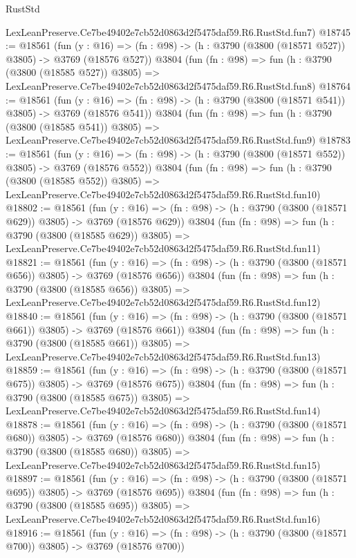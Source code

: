\begin{lexlean}{RustStd}
\begin{coremodule}
    LexLeanPreserve.Ce7be49402e7cb52d0863d2f5475daf59.R6.RustStd.fun7)
@18745 := @18561
    (fun (y : @16) => (fn : @98) -> (h : @3790 (@3800 (@18571 @527)) @3805) -> @3769 (@18576 @527))
    @3804
    (fun (fn : @98) =>
    fun (h : @3790 (@3800 (@18585 @527)) @3805) =>
    LexLeanPreserve.Ce7be49402e7cb52d0863d2f5475daf59.R6.RustStd.fun8)
@18764 := @18561
    (fun (y : @16) => (fn : @98) -> (h : @3790 (@3800 (@18571 @541)) @3805) -> @3769 (@18576 @541))
    @3804
    (fun (fn : @98) =>
    fun (h : @3790 (@3800 (@18585 @541)) @3805) =>
    LexLeanPreserve.Ce7be49402e7cb52d0863d2f5475daf59.R6.RustStd.fun9)
@18783 := @18561
    (fun (y : @16) => (fn : @98) -> (h : @3790 (@3800 (@18571 @552)) @3805) -> @3769 (@18576 @552))
    @3804
    (fun (fn : @98) =>
    fun (h : @3790 (@3800 (@18585 @552)) @3805) =>
    LexLeanPreserve.Ce7be49402e7cb52d0863d2f5475daf59.R6.RustStd.fun10)
@18802 := @18561
    (fun (y : @16) => (fn : @98) -> (h : @3790 (@3800 (@18571 @629)) @3805) -> @3769 (@18576 @629))
    @3804
    (fun (fn : @98) =>
    fun (h : @3790 (@3800 (@18585 @629)) @3805) =>
    LexLeanPreserve.Ce7be49402e7cb52d0863d2f5475daf59.R6.RustStd.fun11)
@18821 := @18561
    (fun (y : @16) => (fn : @98) -> (h : @3790 (@3800 (@18571 @656)) @3805) -> @3769 (@18576 @656))
    @3804
    (fun (fn : @98) =>
    fun (h : @3790 (@3800 (@18585 @656)) @3805) =>
    LexLeanPreserve.Ce7be49402e7cb52d0863d2f5475daf59.R6.RustStd.fun12)
@18840 := @18561
    (fun (y : @16) => (fn : @98) -> (h : @3790 (@3800 (@18571 @661)) @3805) -> @3769 (@18576 @661))
    @3804
    (fun (fn : @98) =>
    fun (h : @3790 (@3800 (@18585 @661)) @3805) =>
    LexLeanPreserve.Ce7be49402e7cb52d0863d2f5475daf59.R6.RustStd.fun13)
@18859 := @18561
    (fun (y : @16) => (fn : @98) -> (h : @3790 (@3800 (@18571 @675)) @3805) -> @3769 (@18576 @675))
    @3804
    (fun (fn : @98) =>
    fun (h : @3790 (@3800 (@18585 @675)) @3805) =>
    LexLeanPreserve.Ce7be49402e7cb52d0863d2f5475daf59.R6.RustStd.fun14)
@18878 := @18561
    (fun (y : @16) => (fn : @98) -> (h : @3790 (@3800 (@18571 @680)) @3805) -> @3769 (@18576 @680))
    @3804
    (fun (fn : @98) =>
    fun (h : @3790 (@3800 (@18585 @680)) @3805) =>
    LexLeanPreserve.Ce7be49402e7cb52d0863d2f5475daf59.R6.RustStd.fun15)
@18897 := @18561
    (fun (y : @16) => (fn : @98) -> (h : @3790 (@3800 (@18571 @695)) @3805) -> @3769 (@18576 @695))
    @3804
    (fun (fn : @98) =>
    fun (h : @3790 (@3800 (@18585 @695)) @3805) =>
    LexLeanPreserve.Ce7be49402e7cb52d0863d2f5475daf59.R6.RustStd.fun16)
@18916 := @18561
    (fun (y : @16) => (fn : @98) -> (h : @3790 (@3800 (@18571 @700)) @3805) -> @3769 (@18576 @700))

\end{coremodule}
\end{lexlean}
